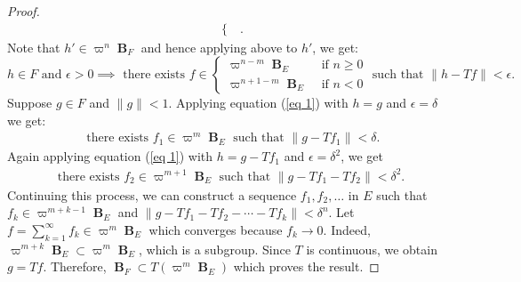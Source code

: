 \documentclass[10pt,a4paper]{amsart}
\DeclareMathOperator{\B}{\textbf{B}}
\begin{document}
\begin{proof}
\begin{align*}
\begin{cases}
		\end{cases}.
	\end{align*}
	Note that $h'\in\varpi^n\B_F$ and hence applying above to $h'$, we get:
	\begin{equation}\label{eq 1}
		h\in F \text{ and }\epsilon>0\implies \text{ there exists } f\in
		\begin{cases}
			\varpi^{n-m}\B_E &\text{ if } n\geq 0\\
			\varpi^{n+1-m}\B_E &\text{ if }n<0
		\end{cases}
		\text{ such that }\|h-Tf\|<\epsilon.
	\end{equation}
	Suppose $g\in F$ and $\|g\|<1$. Applying equation (\ref{eq 1}) with $h=g$ and $\epsilon=\delta$ we get:
	\begin{align*}
		\text{ there exists } f_1\in \varpi^m\B_E \text{ such that }\|g-Tf_1\|<\delta.
	\end{align*}
	Again applying equation (\ref{eq 1}) with $h=g-Tf_1$ and $\epsilon=\delta^2$, we get
	\begin{align*}
		\text{there exists }f_2\in\varpi^{m+1}\B_E \text{ such that }\|g-Tf_1-Tf_2\|<\delta^2.
	\end{align*}
	Continuing this process, we can construct a sequence $f_1,f_2,\ldots$ in $E$ such that $f_k\in\varpi^{m+k-1}\B_E$ and $\|g-Tf_1-Tf_2-\cdots-Tf_k\|<\delta^n$. Let $f=\sum\limits_{k=1}^\infty f_k\in \varpi^m\B_E$ which converges because $f_k\to 0$. Indeed, $\varpi^{m+k}\B_E\subset\varpi^m\B_E$, which is a subgroup. Since $T$ is continuous, we obtain $g=Tf$. Therefore, $\B_F\subset T\left (\varpi^{m}\B_E\right)$ which proves the result.
\end{proof}
\end{document}
